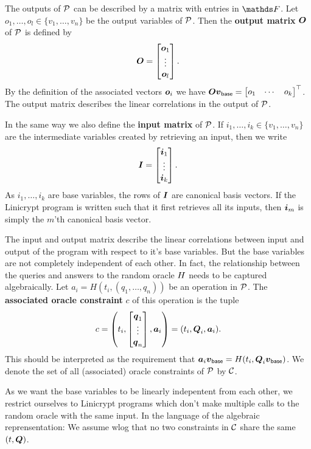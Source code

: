 The outputs of $\P$ can be described by a matrix with entries in $\F$.
Let $o_1, \dots, o_l \in \{v_1, \dots, v_n \}$ be the output variables of $\P$.
Then the \textbf{output matrix} $\O$ of $\P$ is defined by
\[
  \O =
  \begin{bmatrix}
  \v o_1\\
  \vdots \\
  \v o_l
  \end{bmatrix}
  .
\]
By the definition of the associated vectors $\v o_i$ we have
$
\O \vbase = 
  \begin{bmatrix} o_1 & \cdots & o_k \end{bmatrix}^\top
$.
The output matrix describes the linear correlations in the output of $\P$.

In the same way we also define the \textbf{input matrix} of $\P$.
If $i_1, \dots, i_k \in \{v_1, \dots, v_n\}$ are the intermediate variables created by retrieving an input,
then we write
\[
  \Inp = \begin{bmatrix}
  \v i_1 \\
  \vdots \\
  \v i_k
  \end{bmatrix}.
\]
As $i_1, \dots, i_k$ are base variables,
the rows of $\Inp$ are canonical basis vectors.
If the Linicrypt program is written such that it first retrieves all its inputs,
then $\v i_m$ is simply the $m$'th canonical basis vector. 

The input and output matrix describe the linear correlations between input and output of the program with respect to it's base variables.
But the base variables are not completely independent of each other.
In fact, the relationship between the queries and answers to the random oracle $\H$ needs to be captured algebraically.
Let $a_i = H(t_i, (q_1, \dots, q_n))$ be an operation in $\P$.
The \textbf{associated oracle constraint} $c$ of this operation is the tuple
\[
  c = \left( t_i, \begin{bmatrix}
  \v q_1 \\
  \vdots \\
  \v q_n
  \end{bmatrix},
  \va_i \right)
	=
	(t_i, \Q_i, \va_i)
	.
\]
This should be interpreted as the requirement that
$
\va_i \vbase = \H( t_i, \Q_i \vbase)
$.
We denote the set of all (associated) oracle constraints of $\P$ by $\C$.

As we want the base variables to be linearly indepentent from each other,
we restrict ourselves to Linicrypt programs which don't make multiple calls to the random oracle with the same input.
In the language of the algebraic reprensentation:
We assume wlog that no two constraints in $\C$ share the same $(t, \Q)$.

